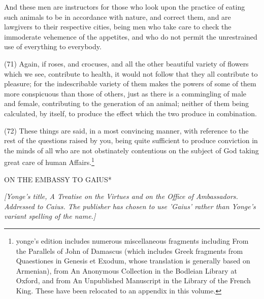 And these men are instructors for those who look upon the practice of eating such animals to be in
accordance with nature, and correct them, and are lawgivers to their respective cities, being men
who take care to check the immoderate vehemence of the appetites, and who do not permit the
unrestrained use of everything to everybody.

(71) Again, if roses, and crocuses, and all the other beautiful variety of flowers which we see,
contribute to health, it would not follow that they all contribute to pleasure; for the indescribable
variety of them makes the powers of some of them more conspicuous than those of others, just as
there is a commingling of male and female, contributing to the generation of an animal; neither of
them being calculated, by itself, to produce the effect which the two produce in combination.

(72) These things are said, in a most convincing manner, with reference to the rest of the
questions raised by you, being quite sufficient to produce conviction in the minds of all who are not
obstinately contentious on the subject of God taking great care of human Affairs.\footnote{yonge's edition
includes numerous miscellaneous fragments including From the Parallels of John of Damascus (which includes Greek
fragments from Quaestiones in Genesis et Exodum, whose translation is generally based on Armenian), from An
Anonymous Collection in the Bodleian Library at Oxford, and from An Unpublished Manuscript in the Library of the French
King. These have been relocated to an appendix in this volume.}


ON THE EMBASSY TO GAIUS*

\emph{[Yonge's title, A Treatise on the Virtues and on the Office of Ambassadors. Addressed to Caius. The publisher has chosen to use 'Gaius' rather than Yonge's variant spelling of the name.]}

